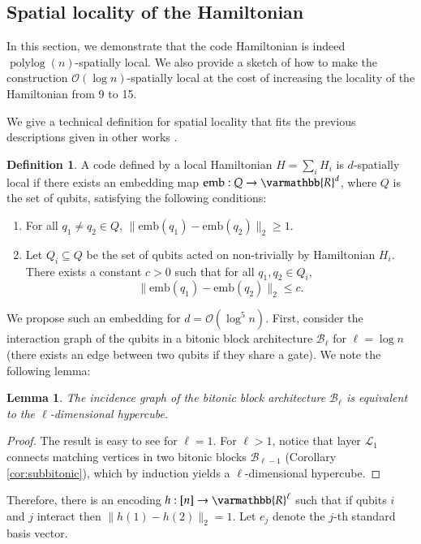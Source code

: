 \documentclass[11pt,letterpaper]{article}
\newtheorem{lemma}[theorem]{Lemma}
\theoremstyle{definition}
\newtheorem{definition}[theorem]{Definition}
\theoremstyle{remark}
\let\mathbb\varmathbb
\newcommand{\norm}[1]{\lVert#1\rVert}
\DeclareMathOperator{\polylog}{polylog}
\newcommand{\cB}{\mathcal B}
\newcommand{\cL}{\mathcal L}
\renewcommand{\leq}{\leqslant}
\renewcommand{\geq}{\geqslant}
\numberwithin{equation}{section}
\theoremstyle{definition}
\begin{document}
%

\subsection{Spatial locality of the Hamiltonian}
\label{sec:spatialLocality}
In this section, we demonstrate that the code Hamiltonian is indeed $\polylog(n)$-spatially local. We also provide a sketch of how to make the construction $\mathcal{O}(\log n)$-spatially local at the cost of increasing the locality of the Hamiltonian from 9 to 15.

We give a technical definition for spatial locality that fits the previous descriptions given in other works \cite{bravyi2009no,flammia2017limits}.

\newcommand{\emb}{\mathrm{emb}}

\begin{definition}
A code defined by a local Hamiltonian $H = \sum_i H_i$ is $d$-spatially local if there exists an embedding map $\emb: Q \rightarrow \mathbb{R}^d$, where $Q$ is the set of qubits, satisfying the following conditions:
\begin{enumerate}
  \item For all $q_1 \neq q_2 \in Q$, $\norm{\emb(q_1) - \emb(q_2)}_2 \geq 1$.
  \item Let $Q_i \subseteq Q$ be the set of qubits acted on non-trivially by Hamiltonian $H_i$. There exists a constant $c > 0$ such that for all $q_1, q_2 \in Q_i$,
  \begin{equation}
    \norm{\emb(q_1) - \emb(q_2)}_2 \leq c.
  \end{equation}
\end{enumerate}
\end{definition}

We propose such an embedding for $d = \mathcal{O}(\log^5 n)$. First, consider the interaction graph of the qubits in a bitonic block architecture $\cB_\ell$ for $\ell = \log n$ (there exists an edge between two qubits if they share a gate). We note the following lemma:

\begin{lemma}
The incidence graph of the bitonic block architecture $\cB_\ell$ is equivalent to the $\ell$-dimensional hypercube.
\end{lemma}

\begin{proof}
The result is easy to see for $\ell = 1$. For $\ell > 1$, notice that layer $\cL_1$ connects matching vertices in two bitonic blocks $\cB_{\ell - 1}$ (Corollary \ref{cor:subbitonic}), which by induction yields a $\ell$-dimensional hypercube.
\end{proof}
Therefore, there is an encoding $h: [n] \rightarrow \mathbb{R}^\ell$ such that if qubits $i$ and $j$ interact then $\norm{h(1) - h(2)}_2 = 1$. Let $e_j$ denote the $j$-th standard basis vector.
\end{document}

